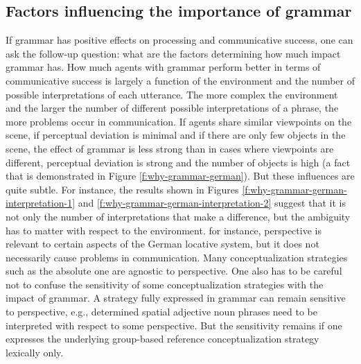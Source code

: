 \subsection{Factors influencing the importance of grammar}
If grammar has positive effects on processing and communicative success, 
one can ask the follow-up question: what are the factors determining
how much impact grammar has. How much agents with 
grammar perform better in terms of communicative success is largely 
a function of the environment and the number of possible 
interpretations of each utterance. The more complex the environment 
and the larger the number of different possible interpretations of a phrase, 
the more problems occur in communication. If agents share similar viewpoints 
on the scene, if perceptual deviation is minimal and if there are only few objects 
in the scene, the effect of grammar is less strong 
than in cases where viewpoints are different, perceptual deviation is strong and the number of objects 
is high (a fact that is demonstrated in Figure \ref{f:why-grammar-german}). 
But these influences are quite subtle. For instance, the results shown in Figures
\ref{f:why-grammar-german-interpretation-1} and \ref{f:why-grammar-german-interpretation-2} suggest that it is not only the number of interpretations that make a difference, but the ambiguity has to matter with respect to the environment. for
instance, perspective is relevant to certain aspects of the German locative system,
but it does not necessarily cause problems in communication. Many conceptualization
strategies such as the absolute one are agnostic to perspective. One
also has to be careful not to confuse the sensitivity of some conceptualization strategies
with the impact of grammar. A strategy fully expressed in grammar can remain 
sensitive to perspective, e.g., determined spatial adjective noun phrases need to be 
interpreted with respect to some perspective. But the sensitivity remains if one expresses the
underlying group-based reference conceptualization strategy lexically only.


